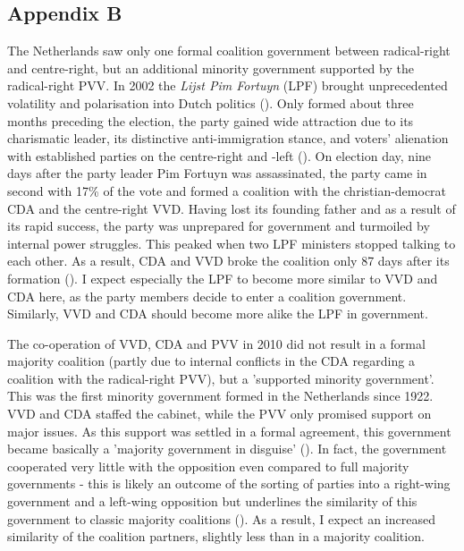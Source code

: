 \documentclass{article}
\begin{document}
\newpage


\subsection*{Appendix B}

The Netherlands saw only one formal coalition government between radical-right and centre-right, but an additional minority government supported by the radical-right PVV. In 2002 the \textit{Lijst Pim Fortuyn} (LPF) brought unprecedented volatility and polarisation into Dutch politics (\cite{Bischof2019a, VanderBrug2003}). Only formed about three months preceding the election, the party gained wide attraction due to its charismatic leader, its distinctive anti-immigration stance, and voters' alienation with established parties on the centre-right and -left (\cite{Lucardie2007LPF, Pennings2003}). On election day, nine days after the party leader Pim Fortuyn was assassinated, the party came in second with 17\% of the vote and formed a coalition with the christian-democrat CDA and the centre-right VVD. Having lost its founding father and as a result of its rapid success, the party was unprepared for government and turmoiled by internal power struggles. This peaked when two LPF ministers stopped talking to each other. As a result, CDA and VVD broke the coalition only 87 days after its formation (\cite{DeLange2011, Heinisch2003, Lucardie2007LPF}). I expect especially the LPF to become more similar to VVD and CDA here, as the party members decide to enter a coalition government. Similarly, VVD and CDA should become more alike the LPF in government.\par

The co-operation of VVD, CDA and PVV in 2010 did not result in a formal majority coalition (partly due to internal conflicts in the CDA regarding a coalition with the radical-right PVV), but a 'supported minority government'. This was the first minority government formed in the Netherlands since 1922. VVD and CDA staffed the cabinet, while the PVV only promised support on major issues. As this support was settled in a formal agreement, this government became basically a 'majority government in disguise' (\cite{Strom1990, VanHolsteyn2011}). In fact, the government cooperated very little with the opposition even compared to full majority governments - this is likely an outcome of the sorting of parties into a right-wing government and a left-wing opposition but underlines the similarity of this government to classic majority coalitions (\cite{Otjes2014}). As a result, I expect an increased similarity of the coalition partners, slightly less than in a majority coalition. \par
\end{document}
